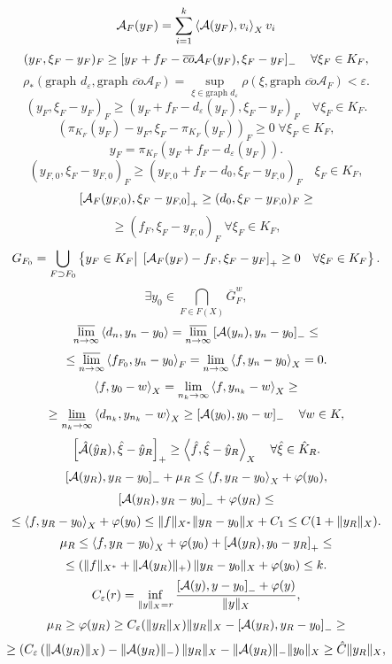 \documentclass[12pt]{book} %
\let\epsilon\varepsilon
\begin{document}
\[\mathcal{A}_F(y_F)=\sum_{i=1}^k\mysca{\mathcal{A}(y_F)}{v_i}_Xv_i\]
\[(y_F,\xi_F-y_F)_F\geq\left[y_F+f_F-\overline{co}\mathcal{A}_F(y_F),\xi_F-y_F\right]_-\quad\forall\xi_F\in K_F,\]
\newcommand{\graph}{\mbox{graph }}
\[\rho_*(\graph d_\epsilon,\graph\overline{co}\mathcal{A}_F)=\sup_{\xi\in\graph d_\epsilon}\rho(\xi,\graph \overline{co}\mathcal{A}_F)<\epsilon.\]
\begin{equation}(y_F,\xi_F-y_F)_F\geq(y_F+f_F-d_\epsilon(y_F),\xi_F-y_F)_F\quad\forall\xi_F\in K_F.\end{equation}
\[(\pi_{K_F}(y_F)-y_F,\xi_F-\pi_{K_F}(y_F))_F\geq0\;\forall\xi_F\in K_F,\]
\[y_F=\pi_{K_F}(y_F+f_F-d_\epsilon(y_F)).\]
\[(y_{F,0},\xi_F-y_{F,0})_F\geq(y_{F,0}+f_F-d_0,\xi_F-y_{F,0})_F\quad\xi_F\in K_F,\]
\[\left[\mathcal{A}_F(y_{F,0}),\xi_F-y_{F,0}\right]_+\geq(d_0,\xi_F-y_{F,0})_F\geq\]\[\geq(f_F,\xi_F-y_{F,0})_F\;\forall\xi_F\in K_F,\]
\[G_{F_0}=\bigcup_{F\supset F_0}\left\{y_F\in K_F\big|\;\left[\mathcal{A}_F(y_F)-f_F,\xi_F-y_F\right]_+\geq0\quad\forall\xi_F\in K_F\right\}.\]
\[\exists y_0\in\bigcap_{F\in F(X)}\overline{G}^w_F,\]
\[\varlimsup_{n\to\infty}\left<d_n,y_n-y_0\right>=\varlimsup_{n\to\infty}\left[\mathcal{A}(y_n),y_n-y_0\right]_-\leq\]
\[\leq\varlimsup_{n\to\infty}\mysca{f_{F_0}}
{y_n-y_0}_F=\lim_{n\to\infty}\mysca{f}{y_n-y_0}_X=0.\]
\[\mysca{f}{y_0-w}_X=\lim_{n_k\to\infty}\mysca{f}{y_{n_k}-w}_X\geq\]
\[\geq\varliminf_{n_k\to\infty}\left<d_{n_k},y_{n_k}-w\right>_X\geq\left[\mathcal{A}(y_0),y_0-w\right]_-\quad\forall w\in K,\]
\begin{equation}\left[\hat{\mathcal{A}}(\hat{y}_R),\hat{\xi}-\hat{y}_R\right]_+\geq\left<\hat{f},\hat{\xi}-\hat{y}_R\right>_X\quad\forall\hat{\xi}\in
	\hat{K}_R.\end{equation}
\begin{equation}\left[\mathcal{A}(y_R),y_R-y_0\right]_-+\mu_R\leq\left<f,y_R-y_0\right>_X+\varphi(y_0),\end{equation}
\[\left[\mathcal{A}(y_R),y_R-y_0\right]_-+\varphi(y_R)\leq\]
\[\leq\left<f,y_R-y_0\right>_X+\varphi(y_0)\leq\|f\|_{X^*}\|y_R-y_0\|_X+C_1\leq C(1+\|
y_R\|_X).\]
\[\mu_R\leq\left<f,y_R-y_0\right>_X+\varphi(y_0)+\left[\mathcal{A}(y_R),y_0-y_R\right]_+\leq\]
\[\leq\left(\|f\|_{X^*}+\|\mathcal{A}(y_R)\|_+\right)\|y_R-y_0
\|_X+\varphi(y_0)\leq k.\]
\[C_\epsilon(r)=\inf_{\mynorm{y}_X=r}\frac{\mysbra{\mathcal{A}(y),y-y_0}_-+\phi(y)}{\mynorm{y}_X},\]
\[\mu_R\geq\phi(y_R)\geq C_\epsilon(\mynorm{y_R}_X)\mynorm{y_R}_X-\mysbra{\mathcal{A}(y_R),y_R-y_0}_-\geq\]
\[\geq\mybra{C_\epsilon\mybra{\mynorm{\mathcal{A}
(y_R)}_X}-\mynorm{\mathcal{A}(y_R)}_-}\mynorm{y_R}_X-\mynorm{\mathcal{A}(y_R)}_-\mynorm{y_0}_X\geq\hat{C}\mynorm{y_R}_X,\]%
\end{document}
